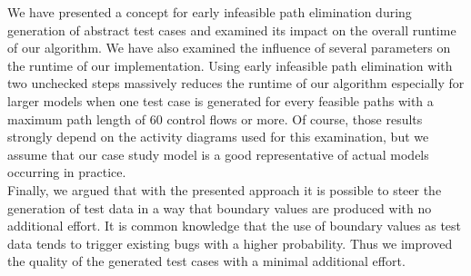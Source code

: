 We have presented a concept for early infeasible path elimination during generation of abstract test cases and examined its impact on the overall runtime of our algorithm. We have also examined the influence of several parameters on the runtime of our implementation. Using early infeasible path elimination with two unchecked steps massively reduces the runtime of our algorithm especially for larger models when one test case is generated for every feasible paths with a maximum path length of 60 control flows or more. Of course, those results strongly depend on the activity diagrams used for this examination, but we assume that our case study model is a good representative of actual models occurring in practice.\\
Finally, we argued that with the presented approach it is possible to steer the generation of test data in a way that boundary values are produced with no additional effort. It is common knowledge that the use of boundary values as test data tends to trigger existing bugs with a higher probability. Thus we improved the quality of the generated test cases with a minimal additional effort.
